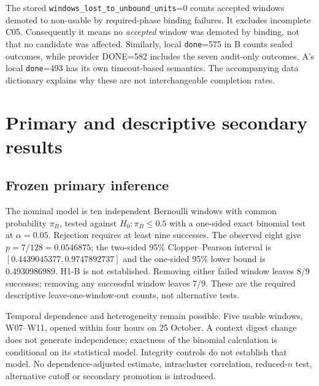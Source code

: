 \documentclass[11pt,a4paper]{article}
\begin{document}
The stored \texttt{windows\_lost\_to\_unbound\_units}=0 counts accepted windows demoted to non-usable by required-phase binding failures. It excludes incomplete C05. Consequently it means no \emph{accepted} window was demoted by binding, not that no candidate was affected. Similarly, local \texttt{done}=575 in B counts sealed outcomes, while provider DONE=582 includes the seven audit-only outcomes. A's local \texttt{done}=493 has its own timeout-based semantics. The accompanying data dictionary explains why these are not interchangeable completion rates.

\section{Primary and descriptive secondary results}
\subsection{Frozen primary inference}
The nominal model is ten independent Bernoulli windows with common probability $\pi_B$, tested against $H_0:\pi_B\leq0.5$ with a one-sided exact binomial test at $\alpha=0.05$. Rejection requires at least nine successes. The observed eight give $p=7/128=0.0546875$; the two-sided 95\% Clopper--Pearson interval is $[0.4439045377,0.9747892737]$ and the one-sided 95\% lower bound is 0.4930986989. H1-B is not established. Removing either failed window leaves 8/9 successes; removing any successful window leaves 7/9. These are the required descriptive leave-one-window-out counts, not alternative tests.

Temporal dependence and heterogeneity remain possible. Five usable windows, W07--W11, opened within four hours on 25 October. A context digest change does not generate independence; exactness of the binomial calculation is conditional on its statistical model. Integrity controls do not establish that model. No dependence-adjusted estimate, intracluster correlation, reduced-$n$ test, alternative cutoff or secondary promotion is introduced.
\end{document}
